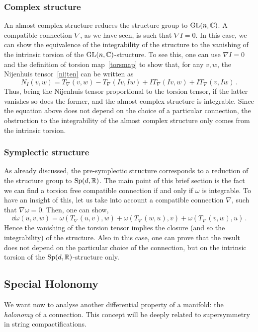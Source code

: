 \documentclass[debug]{phd}
\begin{document}
				\subsubsection{Complex structure}
						An almost complex structure reduces the structure group to $\mathrm{GL}(n, \mathbb{C})$.
						A compatible connection $\nabla$, as we have seen, is such that $\nabla I = 0$.
						In this case, we can show the equivalence of the integrability of the structure to the vanishing of the intrinsic torsion of the $\mathrm{GL}(n, \mathbb{C})$-structure.
  						To see this, one can use $\nabla I = 0$ and the definition of torsion map~\eqref{torsmap} to show that, for any $v,w$, the Nijenhuis tensor~\eqref{nijten} can be written as
								\begin{equation}
									N_{I} (v, w) = T_{\nabla} (v,w) - T_{\nabla} (Iv, Iw) + I T_{\nabla} (Iv,w) + I T_{\nabla} (v, Iw) \, .
								\end{equation}
						Thus, being the Nijenhuis tensor proportional to the torsion tensor, if the latter vanishes so does the former, and the almost complex structure is integrable.
  						Since the equation above does not depend on the choice of a particular connection, the obstruction to the integrability of the almost complex structure only comes from the intrinsic torsion.
				\subsubsection{Symplectic structure}
						As already discussed, the pre-symplectic structure corresponds to a reduction of the structure group to $\mathrm{Sp}(d,\mathbb{R})$.
						The main point of this brief section is the fact we can find a torsion free compatible connection if and only if $\omega$ is integrable.
						To have an insight of this, let us take into account a compatible connection $\nabla$, such that $\nabla \omega = 0$.
						Then, one can show,
								\begin{equation}
									\dd \omega (u, v, w) = \omega(T_\nabla (u,v), w) + \omega(T_\nabla (w,u), v) + \omega(T_\nabla (v,w), u)\, .
								\end{equation}
						Hence the vanishing of the torsion tensor implies the closure (and so the integrability) of the structure.
						Also in this case, one can prove that the result does not depend on the particular choice of the connection, but on the intrinsic torsion of the $\mathrm{Sp}(d, \mathbb{R})$-structure only.
			\subsection{Special Holonomy}
					We want now to analyse another differential property of a manifold: the \emph{holonomy} of a connection.
					This concept will be deeply related to supersymmetry in string compactifications.
					
\end{document}
